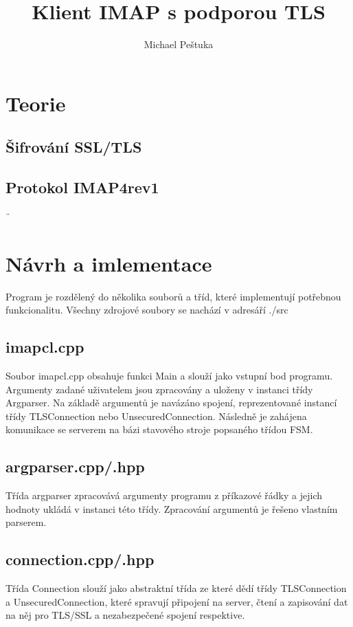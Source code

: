 \documentclass[]{report}
\title{Klient IMAP s podporou TLS}
\author{Michael Peštuka}
\begin{document}
\maketitle

\begin{abstract}
\end{abstract}

\section{Teorie }


\subsection{Šifrování SSL/TLS}
\subsection{Protokol IMAP4rev1}


¨
\section{Návrh a imlementace}
Program je rozdělený do několika souborů a tříd, které implementují potřebnou funkcionalitu. Všechny zdrojové soubory se nachází v adresáří ./src
\subsection{imapcl.cpp}
Soubor imapcl.cpp obsahuje funkci Main a slouží jako vstupní bod programu. Argumenty zadané uživatelem jsou zpracovány a uloženy v instanci třídy Argparser. Na základě argumentů je navázáno spojení, reprezentované instancí třídy TLSConnection nebo UnsecuredConnection. Následně je zahájena komunikace se serverem na bázi stavového stroje popsaného třídou FSM.
\subsection{argparser.cpp/.hpp}
Třída argparser zpracovává argumenty programu z příkazové řádky a jejich hodnoty ukládá v instanci této třídy. Zpracování argumentů je řešeno vlastním parserem.
\subsection{connection.cpp/.hpp}
Třída Connection slouží jako abstraktní třída ze které dědí třídy TLSConnection a UnsecuredConnection, které spravují připojení na server, čtení a zapisování dat na něj pro TLS/SSL a nezabezpečené spojení respektive.
\end{document}
